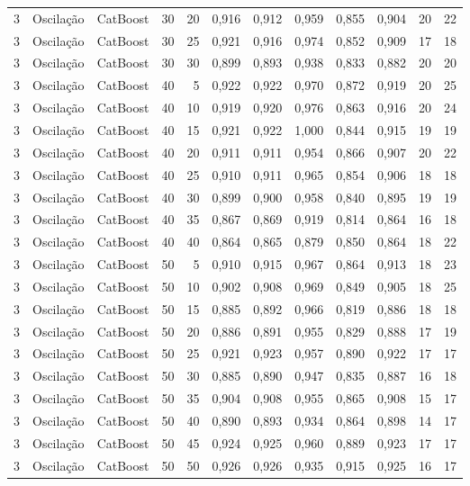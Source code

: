 \begin{longtable}{@{}rllrrrrrrrrr@{}}
3 & Oscilação & CatBoost & 30 & 20 & 0,916 & 0,912 & 0,959 & 0,855 & 0,904 & 20 & 22 \\
3 & Oscilação & CatBoost & 30 & 25 & 0,921 & 0,916 & 0,974 & 0,852 & 0,909 & 17 & 18 \\
3 & Oscilação & CatBoost & 30 & 30 & 0,899 & 0,893 & 0,938 & 0,833 & 0,882 & 20 & 20 \\
3 & Oscilação & CatBoost & 40 & 5 & 0,922 & 0,922 & 0,970 & 0,872 & 0,919 & 20 & 25 \\
3 & Oscilação & CatBoost & 40 & 10 & 0,919 & 0,920 & 0,976 & 0,863 & 0,916 & 20 & 24 \\
3 & Oscilação & CatBoost & 40 & 15 & 0,921 & 0,922 & 1,000 & 0,844 & 0,915 & 19 & 19 \\
3 & Oscilação & CatBoost & 40 & 20 & 0,911 & 0,911 & 0,954 & 0,866 & 0,907 & 20 & 22 \\
3 & Oscilação & CatBoost & 40 & 25 & 0,910 & 0,911 & 0,965 & 0,854 & 0,906 & 18 & 18 \\
3 & Oscilação & CatBoost & 40 & 30 & 0,899 & 0,900 & 0,958 & 0,840 & 0,895 & 19 & 19 \\
3 & Oscilação & CatBoost & 40 & 35 & 0,867 & 0,869 & 0,919 & 0,814 & 0,864 & 16 & 18 \\
3 & Oscilação & CatBoost & 40 & 40 & 0,864 & 0,865 & 0,879 & 0,850 & 0,864 & 18 & 22 \\
3 & Oscilação & CatBoost & 50 & 5 & 0,910 & 0,915 & 0,967 & 0,864 & 0,913 & 18 & 23 \\
3 & Oscilação & CatBoost & 50 & 10 & 0,902 & 0,908 & 0,969 & 0,849 & 0,905 & 18 & 25 \\
3 & Oscilação & CatBoost & 50 & 15 & 0,885 & 0,892 & 0,966 & 0,819 & 0,886 & 18 & 18 \\
3 & Oscilação & CatBoost & 50 & 20 & 0,886 & 0,891 & 0,955 & 0,829 & 0,888 & 17 & 19 \\
3 & Oscilação & CatBoost & 50 & 25 & 0,921 & 0,923 & 0,957 & 0,890 & 0,922 & 17 & 17 \\
3 & Oscilação & CatBoost & 50 & 30 & 0,885 & 0,890 & 0,947 & 0,835 & 0,887 & 16 & 18 \\
3 & Oscilação & CatBoost & 50 & 35 & 0,904 & 0,908 & 0,955 & 0,865 & 0,908 & 15 & 17 \\
3 & Oscilação & CatBoost & 50 & 40 & 0,890 & 0,893 & 0,934 & 0,864 & 0,898 & 14 & 17 \\
3 & Oscilação & CatBoost & 50 & 45 & 0,924 & 0,925 & 0,960 & 0,889 & 0,923 & 17 & 17 \\
3 & Oscilação & CatBoost & 50 & 50 & 0,926 & 0,926 & 0,935 & 0,915 & 0,925 & 16 & 17 \\

\end{longtable}
